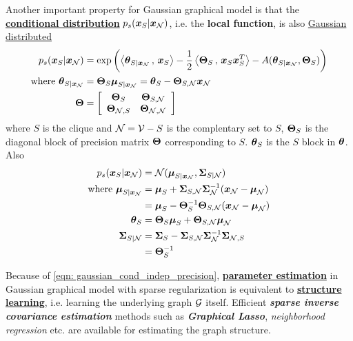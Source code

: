 \documentclass[11pt]{article}
\begin{document}
Another important property for Gaussian graphical model is that the \underline{\textbf{conditional distribution}} $p_s(\boldsymbol{x}_{S} | \boldsymbol{x}_{{\mathcal N}})$, i.e. the \textbf{local function}, is also \underline{Gaussian distributed}
\begin{align}
p_s(\boldsymbol{x}_{S} | \boldsymbol{x}_{{\mathcal N}})  &= \exp\left(\left\langle \boldsymbol{\theta}_{S| \boldsymbol{x}_{{\mathcal N}}}\,,\, \boldsymbol{x}_{S} \right\rangle -  \frac{1}{2}\left\langle \boldsymbol{\Theta}_{S}\,,\, \boldsymbol{x}_{S}\boldsymbol{x}_{S}^{T} \right\rangle - A(\boldsymbol{\theta}_{S| \boldsymbol{x}_{{\mathcal N}}}, \boldsymbol{\Theta}_{S}) \right) \\
\text{where } \boldsymbol{\theta}_{S| \boldsymbol{x}_{{\mathcal N}}} &=\boldsymbol{\Theta}_{S}\boldsymbol{\mu}_{S|\boldsymbol{x}_{{\mathcal N}}} = \boldsymbol{\theta}_{S} -  \boldsymbol{\Theta}_{S, {\mathcal N}}\boldsymbol{x}_{{\mathcal N}}  \nonumber\\
\boldsymbol{\Theta} &=\left[\begin{array}{cc}
\boldsymbol{\Theta}_{S} & \boldsymbol{\Theta}_{S, {\mathcal N}}\\
\boldsymbol{\Theta}_{{\mathcal N}, S} & \boldsymbol{\Theta}_{{\mathcal N},{\mathcal N}}\\
\end{array}\right]
\end{align} where $S$ is the clique and ${\mathcal N} = {\mathcal V} - S$ is the complentary set to $S$, $\boldsymbol{\Theta}_{S}$ is the diagonal block of precision matrix $\boldsymbol{\Theta}$ corresponding to $S$. $\boldsymbol{\theta}_{S}$ is the $S$ block in $\boldsymbol{\theta}$.
Also 
\begin{align}
p_s(\boldsymbol{x}_{S} | \boldsymbol{x}_{{\mathcal N}}) &= {\mathcal N}(\boldsymbol{\mu}_{S| \boldsymbol{x}_{{\mathcal N}}}, \boldsymbol{\Sigma}_{S| {\mathcal N}}) \nonumber \\
\text{where }\boldsymbol{\mu}_{S|\boldsymbol{x}_{{\mathcal N}}} &= \boldsymbol{\mu}_{S} + \boldsymbol{\Sigma}_{S, {\mathcal N}}\boldsymbol{\Sigma}_{{\mathcal N}}^{-1}(\boldsymbol{x}_{{\mathcal N}} - \boldsymbol{\mu}_{{\mathcal N}}) \label{eqn: guassian_conditional_mean}\\
&=  \boldsymbol{\mu}_{S} -   \boldsymbol{\Theta}_{S}^{-1}\boldsymbol{\Theta}_{S, {\mathcal N}}(\boldsymbol{x}_{{\mathcal N}} - \boldsymbol{\mu}_{{\mathcal N}}) \nonumber\\
\boldsymbol{\theta}_{S} &= \boldsymbol{\Theta}_{S}\boldsymbol{\mu}_{S} + \boldsymbol{\Theta}_{S, {\mathcal N}}\boldsymbol{\mu}_{{\mathcal N}} \nonumber\\
\boldsymbol{\Sigma}_{S| {\mathcal N}} &= \boldsymbol{\Sigma}_{S} - \boldsymbol{\Sigma}_{S, {\mathcal N}}\boldsymbol{\Sigma}_{{\mathcal N}}^{-1}\boldsymbol{\Sigma}_{{\mathcal N}, S} \nonumber\\
 &= \boldsymbol{\Theta}_{S}^{-1}  \label{eqn: guassian_conditional_covariance}
\end{align}

Because of \eqref{eqn: gaussian_cond_indep_precision}, \underline{\textbf{parameter estimation}} in Gaussian graphical model with sparse regularization is equivalent to \underline{\textbf{structure learning}}, i.e. learning the underlying graph ${\mathcal G}$ itself. Efficient \textbf{\emph{sparse inverse covariance estimation}} methods such as \emph{\textbf{Graphical Lasso}}, \emph{neighborhood regression} etc. \citep{wainwright2019high} are available for estimating the graph structure.
\end{document}
